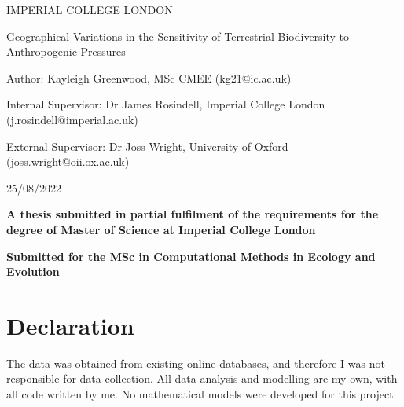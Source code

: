 \documentclass[11pt, a4paper, titlepage]{article}
\begin{document}
    \begin{titlepage}
    \begin{center}
            {\large IMPERIAL COLLEGE LONDON}
    \end{center}
    
    \vspace*{\fill}
    
    \begin{center}
        {\Huge 
    	 Geographical Variations in the Sensitivity of Terrestrial Biodiversity to Anthropogenic Pressures}
        \\[2in]
        \begin{center}
        Author: Kayleigh Greenwood, MSc CMEE (kg21@ic.ac.uk)
        \end{center}
        \bigskip

       Internal Supervisor: Dr James Rosindell, Imperial College London (j.rosindell@imperial.ac.uk)
       \bigskip

       \begin{center}
        External Supervisor: Dr Joss Wright, University of Oxford (joss.wright@oii.ox.ac.uk)
       \end{center}
        \bigskip



        25/08/2022
        \\[2in]
        \begin{center}
        {\bfseries A thesis submitted in partial fulfilment of the requirements for the degree of Master of Science at Imperial College London}
        \end{center}
    
        \begin{center}
        {\bfseries Submitted for the MSc in Computational Methods in Ecology and Evolution }
        \end{center}
        

    
	\end{center}
    \vspace{\fill}
    
    \end{titlepage}
	\section*{Declaration}

	The data was obtained from existing online databases, and therefore I was not responsible for data collection. All data analysis and modelling are my own, with all code written by me. No mathematical models were developed for this project.
\end{document}
